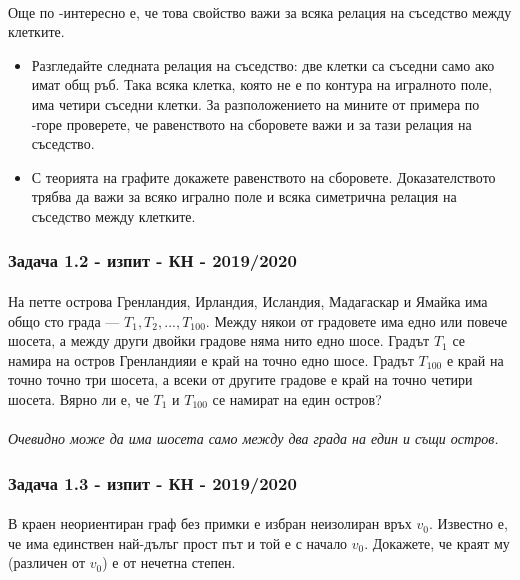 \documentclass[12pt]{article}
\begin{document}
\paragraph*{}
Още по -интересно е, че това свойство важи за всяка релация на съседство между клетките.
\begin{itemize}
    \item Разгледайте следната релация на съседство: две клетки са съседни само ако имат общ ръб. Така всяка клетка, която не е по контура на игралното поле, има четири съседни клетки. За разположението на мините от примера по -горе проверете, че равенството на сборовете важи и за тази релация на съседство.
    \item С теорията на графите докажете равенството на сборовете. Доказателството трябва да важи за всяко игрално поле и всяка симетрична релация на съседство между клетките. 
\end{itemize}
\subsubsection*{Задача 1.2 - изпит - КН - 2019/2020}
\paragraph*{}
На петте острова Гренландия, Ирландия, Исландия, Мадагаскар и Ямайка има общо сто града — $T_1, T_2, ..., T_{100}$. Между някои от градовете има едно или повече шосета, а между други двойки градове няма нито едно шосе. Градът $T_1$ се намира на остров Гренландияи е край на точно едно шосе. Градът $T_{100}$ е край на точно точно три шосета, а всеки от другите градове е край на точно четири шосета. Вярно ли е, че $T_1$ и $T_{100}$ се намират на един остров?
\paragraph*{}
\emph{Очевидно може да има шосета само между два града на един и същи остров.}
\subsubsection*{Задача 1.3 - изпит - КН - 2019/2020}
\paragraph*{}
В краен неориентиран граф без примки е избран неизолиран връх $v_0$. Известно е, че има единствен най-дълъг прост път и той е с начало $v_0$. Докажете, че краят му (различен от $v_0$) е от нечетна степен.
\end{document}
